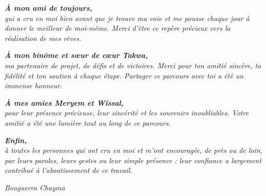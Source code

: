 \vspace{0.3cm}

\begin{center}
\noindent\textbf{\textit{À mon ami de toujours,}}\\
\textit{qui a cru en moi bien avant que je trouve ma voie et me pousse chaque jour
à donner le meilleur de moi-même. Merci d'être ce repère précieux vers la réalisation
de mes rêves.}
\end{center}

\vspace{0.3cm}

\begin{center}
\noindent\textbf{\textit{À mon bin\^ome et s\oe ur de c\oe ur Takwa,}}\\
\textit{ma partenaire de projet, de défis et de victoires. Merci pour ton amitié sincère,
ta fidélité et ton soutien à chaque étape. Partager ce parcours avec toi a été
un immense honneur.}
\end{center}

\vspace{0.3cm}

\begin{center}
\noindent\textbf{\textit{À mes amies Meryem et Wissal,}}\\
\textit{pour leur présence précieuse, leur sincérité et les souvenirs inoubliables.
Votre amitié a été une lumière tout au long de ce parcours.}
\end{center}

\vspace{0.4cm}

\begin{center}
\noindent\textbf{\textit{Enfin,}}\\
\textit{à toutes les personnes qui ont cru en moi et m'ont encouragée,
de près ou de loin, par leurs paroles, leurs gestes ou leur simple présence :
leur confiance a largement contribué à l'aboutissement de ce travail.}
\end{center}

\vspace{0.4cm}

\begin{flushright}
\textit{\Large Bouguerra Chayma}
\end{flushright}

\newpage
